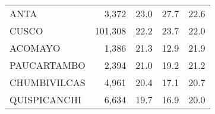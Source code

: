 \begin{tabular}{lrrrr}
	\cellcolor[HTML]{FD6864}ANTA                                            & 3,372                                                                 & 23.0                                                                             & 27.7                                                                        & 22.6                                                                                \\
	\cellcolor[HTML]{FD6864}CUSCO                                           & 101,308                                                               & 22.2                                                                             & 23.7                                                                        & 22.0                                                                                \\
	\cellcolor[HTML]{FD6864}ACOMAYO                                         & 1,386                                                                 & 21.3                                                                             & 12.9                                                                        & 21.9                                                                                \\
	\cellcolor[HTML]{FD6864}PAUCARTAMBO                                     & 2,394                                                                 & 21.0                                                                             & 19.2                                                                        & 21.2                                                                                \\
	\cellcolor[HTML]{FD6864}CHUMBIVILCAS                                    & 4,961                                                                 & 20.4                                                                             & 17.1                                                                        & 20.7                                                                                \\
	\cellcolor[HTML]{FD6864}QUISPICANCHI                                    & 6,634                                                                 & 19.7                                                                             & 16.9                                                                        & 20.0                                                                                \\

\end{tabular}
